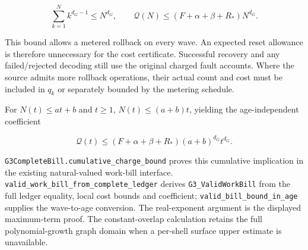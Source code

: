 \documentclass[
]{article}
\begin{document}
\[
\sum_{k=1}^{N}k^{d_G-1}\le N^{d_G},\qquad
\mathcal Q(N)\le(F+\alpha+\beta+R_*)N^{d_G}.
\]

This bound allows a metered rollback on every wave. An expected reset
allowance is therefore unnecessary for the cost certificate. Successful
recovery and any
f\allowbreak{}a\allowbreak{}i\allowbreak{}l\allowbreak{}e\allowbreak{}d\allowbreak{}/\allowbreak{}r\allowbreak{}e\allowbreak{}j\allowbreak{}e\allowbreak{}c\allowbreak{}t\allowbreak{}e\allowbreak{}d
decoding still use the original charged fault accounts. Where the source
admits more rollback operations, their actual count and cost must be
included in \(q_k\) or separately bounded by the metering schedule.

For \(N(t)\le at+b\) and \(t\ge1\), \(N(t)\le(a+b)t\), yielding the
age-independent coefficient

\[
\mathcal Q(t)\le
(F+\alpha+\beta+R_*)(a+b)^{d_G}t^{d_G}.
\]

\texttt{G\allowbreak{}3\allowbreak{}C\allowbreak{}o\allowbreak{}m\allowbreak{}p\allowbreak{}l\allowbreak{}e\allowbreak{}t\allowbreak{}e\allowbreak{}B\allowbreak{}i\allowbreak{}l\allowbreak{}l\allowbreak{}.\allowbreak{}c\allowbreak{}u\allowbreak{}m\allowbreak{}u\allowbreak{}l\allowbreak{}a\allowbreak{}t\allowbreak{}i\allowbreak{}v\allowbreak{}e\allowbreak{}\_\allowbreak{}c\allowbreak{}h\allowbreak{}a\allowbreak{}r\allowbreak{}g\allowbreak{}e\allowbreak{}\_\allowbreak{}b\allowbreak{}o\allowbreak{}u\allowbreak{}n\allowbreak{}d}
proves this cumulative implication in the existing natural-valued
work-bill interface.
\texttt{v\allowbreak{}a\allowbreak{}l\allowbreak{}i\allowbreak{}d\allowbreak{}\_\allowbreak{}w\allowbreak{}o\allowbreak{}r\allowbreak{}k\allowbreak{}\_\allowbreak{}b\allowbreak{}i\allowbreak{}l\allowbreak{}l\allowbreak{}\_\allowbreak{}f\allowbreak{}r\allowbreak{}o\allowbreak{}m\allowbreak{}\_\allowbreak{}c\allowbreak{}o\allowbreak{}m\allowbreak{}p\allowbreak{}l\allowbreak{}e\allowbreak{}t\allowbreak{}e\allowbreak{}\_\allowbreak{}l\allowbreak{}e\allowbreak{}d\allowbreak{}g\allowbreak{}e\allowbreak{}r}
derives \texttt{G3\_ValidWorkBill} from the full ledger equality, local
cost bounds and coefficient;
\texttt{v\allowbreak{}a\allowbreak{}l\allowbreak{}i\allowbreak{}d\allowbreak{}\_\allowbreak{}b\allowbreak{}i\allowbreak{}l\allowbreak{}l\allowbreak{}\_\allowbreak{}b\allowbreak{}o\allowbreak{}u\allowbreak{}n\allowbreak{}d\allowbreak{}\_\allowbreak{}i\allowbreak{}n\allowbreak{}\_\allowbreak{}a\allowbreak{}g\allowbreak{}e}
supplies the wave-to-age conversion. The real-exponent argument is the
displayed maximum-term proof. The constant-overlap calculation retains
the full polynomial-growth graph domain when a per-shell surface upper
estimate is unavailable.
\end{document}
